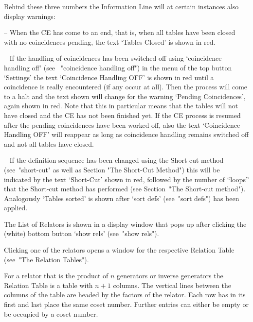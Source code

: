 \enditems

Behind these three numbers the Information Line will at certain
instances also display warnings:

\beginlist

\item{--} When the CE has come to an end, that is, when all tables
  have been closed with no coincidences pending, the text `Tables
  Closed' is shown in red.

\item{--} If the handling of coincidences has been switched off using
  `coincidence handling off' (see ~"coincidence handling off") in the
  menu of the top button `Settings' the text `Coincidence Handling OFF'
  is shown in red until a coincidence is really encountered (if any
  occur at all). Then the process will come to a halt and the text
  shown will change for the warning `Pending Coincidences', again shown
  in red. Note that this in particular means that the tables will not
  have closed and the CE has not been finished yet. If the CE process is
  resumed after the pending coincidences have been worked off, also the
  text `Coincidence Handling OFF' will reappear as long as coincidence
  handling remains switched off and not all tables have closed.

\item{--} If the definition sequence has been changed using the
  Short-cut method (see~"short-cut" as well as Section "The Short-Cut
  Method") this will be indicated by the text `Short-Cut' shown in red,
  followed by the number of ``loops'' that the Short-cut method has
  performed (see Section~"The Short-cut method"). Analogously `Tables
  sorted' is shown after `sort defs' (see~"sort defs") has been applied.


\endlist



The List of Relators is shown in a display window that pops up
after clicking the (white) bottom button `show rels' (see~"show
rels").

Clicking one of the relators opens a window for the respective
Relation Table (see~"The Relation Tables").



For a relator that is the product of $n$ generators or inverse
generators the Relation Table is a table with $n+1$ columns. The
vertical lines between the columns of the table are headed by the
factors of the relator. Each row has in its first and last place the
same coset number. Further entries can either be empty or be occupied
by a coset number.

